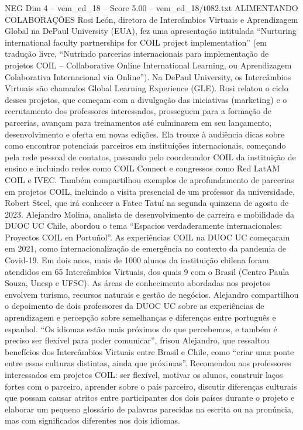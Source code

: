 \begin{textsample}{NEG Dim 4 – vem\_ed\_18 – Score 5.00 – vem\_ed\_18/t082.txt}  \label{ex:f4_neg_124}
ALIMENTANDO COLABORAÇÕES Rosi León, diretora de Intercâmbios Virtuais e Aprendizagem Global na DePaul University (EUA), fez uma apresentação intitulada “Nurturing international faculty partnerships for COIL project implementation” (em tradução livre, “Nutrindo parcerias internacionais para implementação de projetos COIL – Collaborative Online International Learning, ou Aprendizagem Colaborativa Internacional via Online”).
Na DePaul University, os Intercâmbios Virtuais são chamados Global Learning Experience (GLE).
Rosi relatou o ciclo desses projetos, que começam com a divulgação das iniciativas (marketing) e o recrutamento dos professores interessados, prosseguem para a formação de parcerias, avançam para treinamentos até culminarem em seu lançamento, desenvolvimento e oferta em novas edições.
Ela trouxe à audiência dicas sobre como encontrar potenciais parceiros em instituições internacionais, começando pela rede pessoal de contatos, passando pelo coordenador COIL da instituição de ensino e incluindo redes como COIL Connect e congressos como Red LatAM COIL e IVEC.
Também compartilhou exemplos de aprofundamento de parcerias em projetos COIL, incluindo a visita presencial de um professor da universidade, Robert Steel, que irá conhecer a Fatec Tatuí na segunda quinzena de agosto de 2023.
Alejandro Molina, analista de desenvolvimento de carreira e mobilidade da DUOC UC Chile, abordou o tema “Espacios verdaderamente internacionales: Proyectos COIL en Portuñol”.
As experiências COIL na DUOC UC começaram em 2021, como internacionalização de emergência no contexto da pandemia de Covid-19.
Em dois anos, mais de 1000 alunos da instituição chilena foram atendidos em 65 Intercâmbios Virtuais, dos quais 9 com o Brasil (Centro Paula Souza, Unesp e UFSC).
As áreas de conhecimento abordadas nos projetos envolvem turismo, recursos naturais e gestão de negócios.
Alejandro compartilhou o depoimento de dois professores da DUOC UC sobre as experiências de aprendizagem e percepção sobre semelhanças e diferenças entre português e espanhol. “Os idiomas estão mais próximos do que percebemos, e também é preciso ser flexível para poder comunicar”, frisou Alejandro, que ressaltou benefícios dos Intercâmbios Virtuais entre Brasil e Chile, como “criar uma ponte entre essas culturas distintas, ainda que próximas”.
Recomendou aos professores interessados em projetos COIL: ser flexível, motivar os alunos, construir laços fortes com o parceiro, aprender sobre o país parceiro, discutir diferenças culturais que possam causar atritos entre participantes dos dois países durante o projeto e elaborar um pequeno glossário de palavras parecidas na escrita ou na pronúncia, mas com significados diferentes nos dois idiomas.

\end{textsample}
